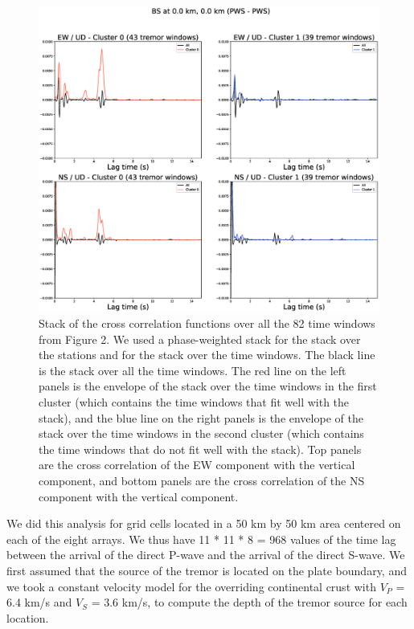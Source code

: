 \documentclass[draft]{agujournal2019}
\begin{document}
\begin{figure}
\noindent\includegraphics[width=\textwidth, trim={4.5cm 2.5cm 5cm 4cm},clip]{figures/BS_000_000_PWS_PWS_cluster_stackcc.eps}
\caption{Stack of the cross correlation functions over all the 82 time windows from Figure 2. We used a phase-weighted stack for the stack over the stations and for the stack over the time windows. The black line is the stack over all the time windows. The red line on the left panels is the envelope of the stack over the time windows in the first cluster (which contains the time windows that fit well with the stack), and the blue line on the right panels is the envelope of the stack over the time windows in the second cluster (which contains the time windows that do not fit well with the stack). Top panels are the cross correlation of the EW component with the vertical component, and bottom panels are the cross correlation of the NS component with the vertical component.}
\label{pngfiguresample}
\end{figure}

We did this analysis for grid cells located in a 50 km by 50 km area centered on each of the eight arrays. We thus have 11 * 11 * 8 = 968 values of the time lag between the arrival of the direct P-wave and the arrival of the direct S-wave. We first assumed that the source of the tremor is located on the plate boundary, and we took a constant velocity model for the overriding continental crust with $V_P$ = 6.4 km/s and $V_S$ = 3.6 km/s, to compute the depth of the tremor source for each location.
\end{document}
